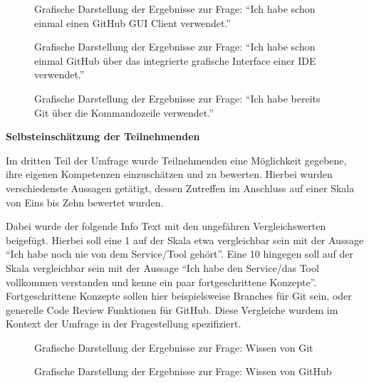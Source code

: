 \documentclass[
	ngerman,
	BCOR=8mm,
	headings=normal,
	parskip=half,
	headsepline,
	automark,
	listof=totoc,
	bibliography=totoc,
]{scrreprt}
\begin{document}
\begin{figure}[h!]
    \centering
    
    \caption{Grafische Darstellung der Ergebnisse zur Frage: ``Ich habe schon einmal einen GitHub GUI Client verwendet.''}
\end{figure}

\begin{figure}[h!]
    \centering
    
    \caption{Grafische Darstellung der Ergebnisse zur Frage: ``Ich habe schon einmal GitHub über das integrierte grafische Interface einer IDE verwendet.''}
\end{figure}

\begin{figure}[h!]
    \centering
    
    \caption{Grafische Darstellung der Ergebnisse zur Frage: ``Ich habe bereits Git über die Kommandozeile verwendet.''}
\end{figure}

\newpage
{\LARGE \textbf{Selbsteinschätzung der Teilnehmenden}}

Im dritten Teil der Umfrage wurde Teilnehmenden eine Möglichkeit gegebene, ihre eigenen Kompetenzen einzuschätzen und zu bewerten.
Hierbei wurden verschiedenste Aussagen getätigt, dessen Zutreffen im Anschluss auf einer Skala von Eins bis Zehn bewertet wurden.

Dabei wurde der folgende Info Text mit den ungefähren Vergleichswerten beigefügt. Hierbei soll eine 1 auf der Skala etwa vergleichbar sein mit der Aussage ``Ich habe noch nie von dem Service/Tool gehört''. 
Eine 10 hingegen soll auf der Skala vergleichbar sein mit der Aussage ``Ich habe den Service/das Tool vollkommen verstanden und kenne ein paar fortgeschrittene Konzepte''.
Fortgeschrittene Konzepte sollen hier beispielsweise Branches für Git sein, oder generelle Code Review Funktionen für GitHub. Diese Vergleiche wurdem im Kontext der Umfrage in der Fragestellung spezifiziert.

\begin{figure}[h!]
    \centering
    
    \caption{Grafische Darstellung der Ergebnisse zur Frage: Wissen von Git}
\end{figure}

\begin{figure}[h!]
    \centering
    
    \caption{Grafische Darstellung der Ergebnisse zur Frage: Wissen von GitHub}
\end{figure}
\end{document}
